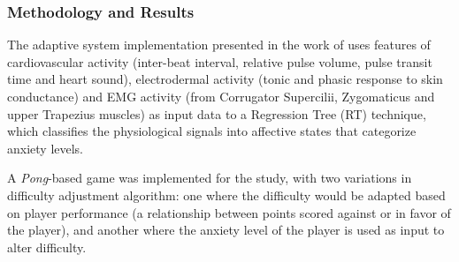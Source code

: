 \subsubsection{Methodology and Results}



The adaptive system implementation presented in the work of \citet{article_affectivedda} uses features of cardiovascular activity (inter-beat interval, relative pulse volume, pulse transit time and heart sound), electrodermal activity (tonic and phasic response to skin conductance) and EMG activity (from Corrugator Supercilii, Zygomaticus and upper Trapezius muscles) as input data to a Regression Tree (RT) technique, which classifies the physiological signals into affective states that categorize anxiety levels.

A \emph{Pong}-based game was implemented for the study, with two variations in difficulty adjustment algorithm: one where the difficulty would be adapted based on player performance (a relationship between points scored against or in favor of the player), and another where the anxiety level of the player is used as input to alter difficulty.

